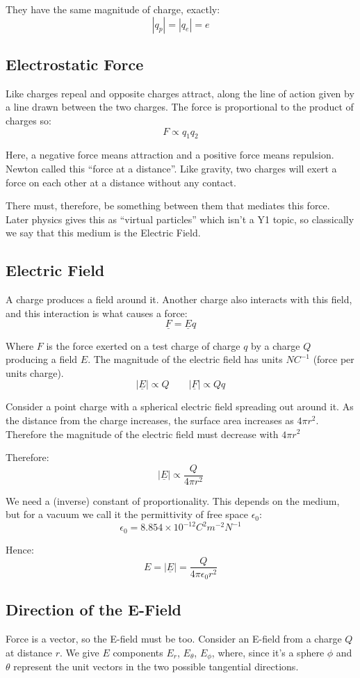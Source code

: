 They have the same magnitude of charge, exactly:
\[
    |q_p| = |q_e| = e
\]

\subsection{Electrostatic Force}
Like charges repeal and opposite charges attract, along the line of action given by a line drawn between the two charges. The force is proportional to the product of charges so:
\[
    F \propto q_1 q_2
\]

Here, a negative force means attraction and a positive force means repulsion. Newton called this ``force at a distance''. Like gravity, two charges will exert a force on each other at a distance without any contact. 

There must, therefore, be something between them that mediates this force. Later physics gives this as ``virtual particles'' which isn't a Y1 topic, so classically we say that this medium is the Electric Field.

\subsection{Electric Field}
A charge produces a field around it. Another charge also interacts with this field, and this interaction is what causes a force:
\[
    \underline{F} = \underline{E} q 
\]

Where $F$ is the force exerted on a test charge of charge $q$ by a charge $Q$ producing a field $E$. The magnitude of the electric field has units $NC^{-1}$ (force per units charge).
\[
    |\underline{E}| \propto Q \qquad |\underline{F}| \propto Qq
\]

Consider a point charge with a spherical electric field spreading out around it. As the distance from the charge increases, the surface area increases as $4 \pi r^2$. Therefore the magnitude of the electric field must decrease with $4 \pi r^2$ 

Therefore:
\[
    |\underline{E}| \propto \frac{Q}{4 \pi r^2}
\]

We need a (inverse) constant of proportionality. This depends on the medium, but for a vacuum we call it the permittivity of free space $\epsilon_0$:
\[
    \epsilon_0 = 8.854 \times 10^{-12} C^2m^{-2} N^{-1}
\]

Hence:
\[
    \boxed{E = |\underline{E}| = \frac{Q}{4 \pi \epsilon_0 r^2}}
\]

\subsection{Direction of the E-Field}
Force is a vector, so the E-field must be too. Consider an E-field from a charge $Q$ at distance $r$. We give $E$ components $E_r$, $E_\theta$, $E_\phi$, where, since it's a sphere $\phi$ and $\theta$ represent the unit vectors in the two possible tangential directions.

